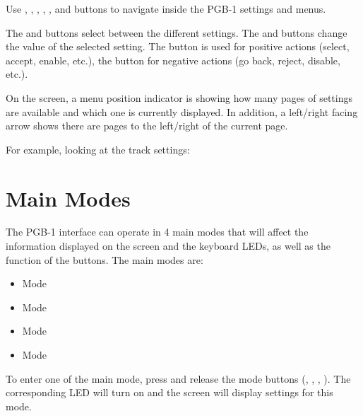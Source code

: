 \documentclass[8pt]{extarticle}
\def\device{PGB-1 }
\newcommand{\OLEDscreenshot}[1]{
\begin{tcolorbox}[hbox, colframe=black, colback=white, boxsep=-3pt]%
\texttt{[image: \#1]}
\end{tcolorbox}
}
\begin{document}
\begin{multicols*}{3}
Use , , , , , and  buttons to navigate inside the \device settings and menus.

The  and  buttons select between the different settings.
The  and  buttons change the value of the selected setting.
The  button is used for positive actions (select, accept, enable, etc.), 
the  button for negative actions (go back, reject, disable, etc.).

On the screen, a menu position indicator is showing how many pages of settings are available and which one is currently displayed.
In addition, a left/right facing arrow shows there are pages to the left/right of the current page. 

For example, looking at the track settings:

\begin{center}
\end{center}

\section{Main Modes}

The \device interface can operate in 4 main modes that will affect the information displayed on the screen and the keyboard LEDs, as well as the function of the buttons.
The main modes are:
\begin{itemize}
    \item {} Mode
    \item {} Mode
    \item {} Mode
    \item {} Mode
\end{itemize}

To enter one of the main mode, press and release the mode buttons (, , , ). The corresponding LED will turn on and the screen will display settings for this mode.


\end{multicols*}
\end{document}
